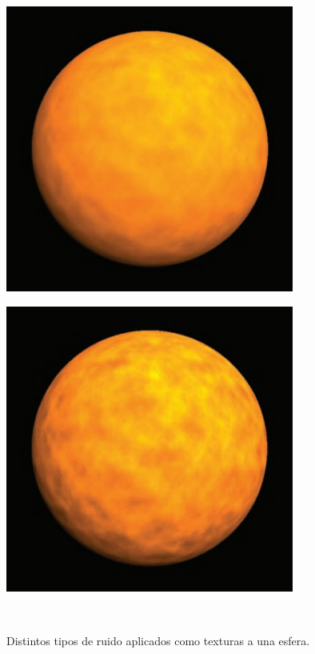 \begin{figure}[htbp]
\centering
    \hspace{-4mm}
    \begin{minipage}{0.5\textwidth}
        \centering
        \includegraphics[scale=0.5]{Images/Shaders/luna1.jpg}\\
    \end{minipage}
    \begin{minipage}{0.5\textwidth}
        \centering
        \includegraphics[scale=0.5]{Images/Shaders/luna2.jpg}\\
    \end{minipage}\\
    \caption[Distintos tipos de ruido aplicados como texturas a una esfera]{Distintos tipos de ruido aplicados como texturas a una esfera\footnotemark.}
    \label{fig:shadernoise}
\end{figure}

